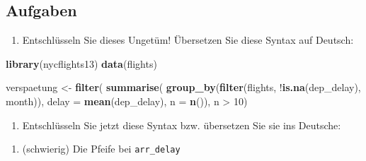 \documentclass[12pt,ngerman,]{book}
\makeatletter
\newenvironment{Shaded}{\begin{snugshade}}{\end{snugshade}}
\newcommand{\KeywordTok}[1]{\textcolor[rgb]{0.13,0.29,0.53}{\textbf{{#1}}}}
\newcommand{\DataTypeTok}[1]{\textcolor[rgb]{0.13,0.29,0.53}{{#1}}}
\newcommand{\DecValTok}[1]{\textcolor[rgb]{0.00,0.00,0.81}{{#1}}}
\newcommand{\StringTok}[1]{\textcolor[rgb]{0.31,0.60,0.02}{{#1}}}
\newcommand{\NormalTok}[1]{{#1}}
\providecommand{\tightlist}{%
  \setlength{\itemsep}{0pt}\setlength{\parskip}{0pt}}
\newenvironment{kframe}{%
\medskip{}
\setlength{\fboxsep}{.8em}
 \def\at@end@of@kframe{}%
 \ifinner\ifhmode%
  \def\at@end@of@kframe{\end{minipage}}%
  \begin{minipage}{\columnwidth}%
 \fi\fi%
 \def\FrameCommand##1{\hskip\@totalleftmargin \hskip-\fboxsep
 \colorbox{shadecolor}{##1}\hskip-\fboxsep
     \hskip-\linewidth \hskip-\@totalleftmargin \hskip\columnwidth}%
 \MakeFramed {\advance\hsize-\width
   \@totalleftmargin\z@ \linewidth\hsize
   \@setminipage}}%
 {\par\unskip\endMakeFramed%
 \at@end@of@kframe}
\renewenvironment{Shaded}{\begin{kframe}}{\end{kframe}}
\makeatother
\begin{document}
\subsection{Aufgaben}\label{aufgaben-9}

\begin{enumerate}
\def\labelenumi{\arabic{enumi}.}
\tightlist
\item
  Entschlüsseln Sie dieses Ungetüm! Übersetzen Sie diese Syntax auf
  Deutsch:
\end{enumerate}

\begin{Shaded}
\begin{Highlighting}[]

\KeywordTok{library}\NormalTok{(nycflights13)}
\KeywordTok{data}\NormalTok{(flights)}

\NormalTok{verspaetung <-}
\StringTok{  }\KeywordTok{filter}\NormalTok{(}
    \KeywordTok{summarise}\NormalTok{(}
    \KeywordTok{group_by}\NormalTok{(}\KeywordTok{filter}\NormalTok{(flights, !}\KeywordTok{is.na}\NormalTok{(dep_delay), month)), }
    \DataTypeTok{delay =} \KeywordTok{mean}\NormalTok{(dep_delay), }\DataTypeTok{n =} \KeywordTok{n}\NormalTok{()), n >}\StringTok{ }\DecValTok{10}\NormalTok{)}
 
\end{Highlighting}
\end{Shaded}

\begin{enumerate}
\def\labelenumi{\arabic{enumi}.}
\setcounter{enumi}{1}
\tightlist
\item
  Entschlüsseln Sie jetzt diese Syntax bzw. übersetzen Sie sie ins
  Deutsche:
\end{enumerate}

\begin{Shaded}
\end{Shaded}

\begin{enumerate}
\def\labelenumi{\arabic{enumi}.}
\setcounter{enumi}{2}
\tightlist
\item
  (schwierig) Die Pfeife bei \texttt{arr\_delay}
\end{enumerate}
\end{document}
